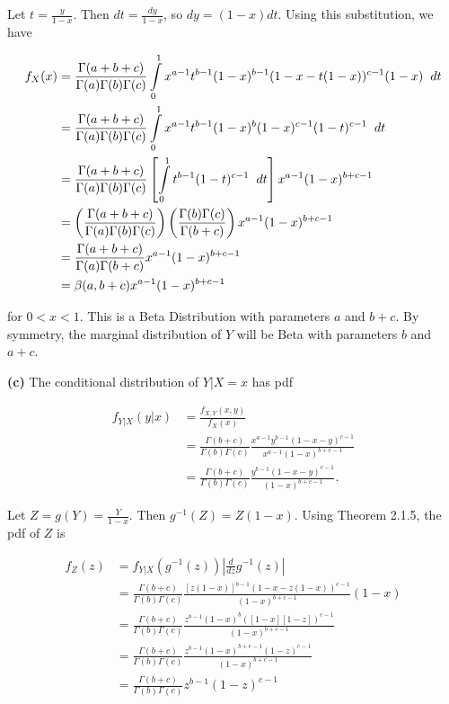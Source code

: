 \documentclass{article}
\begin{document}
\noindent Let $t = \frac{y}{1-x}$.  Then $dt = \frac{dy}{1-x}$, so $dy = (1-x)dt$.  Using this substitution, we have

\pagebreak

\begin{align}
f_X(x) &= \frac{\Gamma(a+b+c)}{\Gamma(a)\Gamma(b)\Gamma(c)} \int\limits_0^1x^{a-1}t^{b-1}(1-x)^{b-1}(1-x-t(1-x))^{c-1}(1-x) \hspace{2mm} dt \\
&= \frac{\Gamma(a+b+c)}{\Gamma(a)\Gamma(b)\Gamma(c)} \int\limits_0^1x^{a-1}t^{b-1}(1-x)^{b}(1-x)^{c-1}(1-t)^{c-1} \hspace{2mm} dt \\
&= \frac{\Gamma(a+b+c)}{\Gamma(a)\Gamma(b)\Gamma(c)} \left[ \int\limits_0^1t^{b-1}(1-t)^{c-1} \hspace{2mm} dt\right] x^{a-1}(1-x)^{b+c-1}  \\
&= \left(\frac{\Gamma(a+b+c)}{\Gamma(a)\Gamma(b)\Gamma(c)}\right)\left(\frac{\Gamma(b)\Gamma(c)}{\Gamma(b+c)}\right)x^{a-1}(1-x)^{b+c-1} \\
&= \frac{\Gamma(a+b+c)}{\Gamma(a)\Gamma(b+c)}x^{a-1}(1-x)^{b+c-1} \\
&= \beta(a,b+c)x^{a-1}(1-x)^{b+c-1}
\end{align}

\noindent for $0<x<1$.  This is a Beta Distribution with parameters $a$ and $b+c$.  By symmetry, the marginal distribution of $Y$ will be Beta with parameters $b$ and $a+c$.  

\vspace{3mm}

\noindent \textbf{(c)}  The conditional distribution of $Y|X=x$ has pdf

\begin{align}
f_{Y|X}(y|x) &= \frac{f_{X,Y}(x,y)}{f_X(x)} \\
&= \frac{\Gamma(b+c)}{\Gamma(b)\Gamma(c)} \frac{x^{a-1}y^{b-1}(1-x-y)^{c-1}}{x^{a-1}(1-x)^{b+c-1}} \\
&= \frac{\Gamma(b+c)}{\Gamma(b)\Gamma(c)}\frac{y^{b-1}(1-x-y)^{c-1}}{(1-x)^{b+c-1}}.
\end{align}

\noindent Let $Z=g(Y)=\frac{Y}{1-x}$.  Then $g^{-1}(Z) = Z(1-x)$.  Using Theorem 2.1.5, the pdf of $Z$ is

\begin{align}
f_Z(z) &= f_{Y|X}(g^{-1}(z))\left|\frac{d}{dz}g^{-1}(z)\right| \\
&= \frac{\Gamma(b+c)}{\Gamma(b)\Gamma(c)}\frac{[z(1-x)]^{b-1}(1-x-z(1-x))^{c-1}}{(1-x)^{b+c-1}}(1-x) \\
&= \frac{\Gamma(b+c)}{\Gamma(b)\Gamma(c)}\frac{z^{b-1}(1-x)^{b}([1-x][1-z])^{c-1}}{(1-x)^{b+c-1}} \\
&= \frac{\Gamma(b+c)}{\Gamma(b)\Gamma(c)}\frac{z^{b-1}(1-x)^{b+c-1}(1-z)^{c-1}}{(1-x)^{b+c-1}} \\
&= \frac{\Gamma(b+c)}{\Gamma(b)\Gamma(c)}z^{b-1}(1-z)^{c-1}
\end{align}
\end{document}
